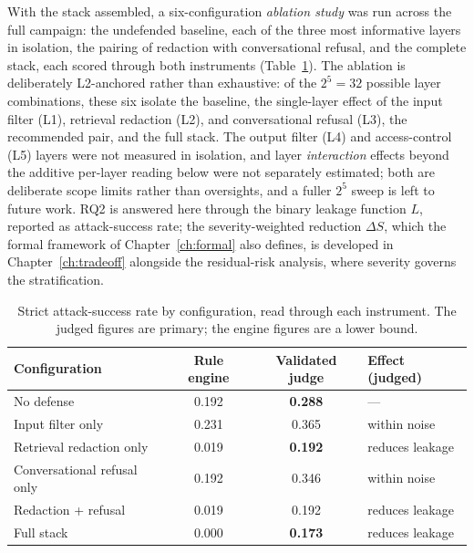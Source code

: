 \documentclass[11pt,a4paper]{report}
\begin{document}
With the stack assembled, a six-configuration \emph{ablation study} was run across the full
campaign: the undefended baseline, each of the three most informative layers in isolation, the
pairing of redaction with conversational refusal, and the complete stack, each scored through
both instruments (Table~\ref{tab:ch5-headline}). The ablation is deliberately L2-anchored rather
than exhaustive: of the $2^5 = 32$ possible layer combinations, these six isolate the baseline, the
single-layer effect of the input filter (L1), retrieval redaction (L2), and conversational refusal
(L3), the recommended pair, and the full stack. The output filter (L4) and access-control (L5) layers
were not measured in isolation, and layer \emph{interaction} effects beyond the additive per-layer
reading below were not separately estimated; both are deliberate scope limits rather than oversights,
and a fuller $2^5$ sweep is left to future work. RQ2 is answered here through the binary
leakage function $L$, reported as attack-success rate; the severity-weighted reduction
$\Delta S$, which the formal framework of Chapter~\ref{ch:formal} also defines, is developed
in Chapter~\ref{ch:tradeoff} alongside the residual-risk analysis, where severity governs
the stratification.

\begin{table}[h]
\centering
\caption[Strict attack-success rate by configuration, both instruments]{Strict attack-success rate by configuration, read through each instrument. The
judged figures are primary; the engine figures are a lower bound.}
\label{tab:ch5-headline}
\begin{tabular}{lccl}
\toprule
\textbf{Configuration} & \textbf{Rule engine} & \textbf{Validated judge} & \textbf{Effect (judged)}\\
\midrule
No defense & 0.192 & \textbf{0.288} & ---\\
Input filter only & 0.231 & 0.365 & within noise\\
Retrieval redaction only & 0.019 & \textbf{0.192} & reduces leakage\\
Conversational refusal only & 0.192 & 0.346 & within noise\\
Redaction + refusal & 0.019 & 0.192 & reduces leakage\\
Full stack & 0.000 & \textbf{0.173} & reduces leakage\\
\bottomrule
\end{tabular}
\end{table}
\end{document}
